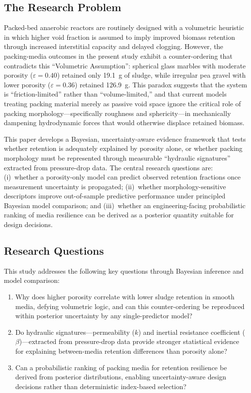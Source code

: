 \documentclass[12pt,a4paper]{article}
\begin{document}
\subsection{The Research Problem}
Packed-bed anaerobic reactors are routinely designed with a volumetric heuristic in which higher void fraction is assumed to imply improved biomass retention through increased interstitial capacity and delayed clogging. However, the packing-media outcomes in the present study exhibit a counter-ordering that contradicts this ``Volumetric Assumption'': spherical glass marbles with moderate porosity ($\varepsilon=0.40$) retained only 19.1~g of sludge, while irregular pea gravel with lower porosity ($\varepsilon=0.36$) retained 126.9~g. This paradox suggests that the system is ``friction-limited'' rather than ``volume-limited,'' and that current models treating packing material merely as passive void space ignore the critical role of packing morphology---specifically roughness and sphericity---in mechanically dampening hydrodynamic forces that would otherwise displace retained biomass.

This paper develops a Bayesian, uncertainty-aware evidence framework that tests whether retention is adequately explained by porosity alone, or whether packing morphology must be represented through measurable ``hydraulic signatures'' extracted from pressure-drop data. The central research questions are: (i)~whether a porosity-only model can predict observed retention fractions once measurement uncertainty is propagated; (ii)~whether morphology-sensitive descriptors improve out-of-sample predictive performance under principled Bayesian model comparison; and (iii)~whether an engineering-facing probabilistic ranking of media resilience can be derived as a posterior quantity suitable for design decisions.

\subsection{Research Questions}
This study addresses the following key questions through Bayesian inference and model comparison:
\begin{enumerate}
    \item Why does higher porosity correlate with lower sludge retention in smooth media, defying volumetric logic, and can this counter-ordering be reproduced within posterior uncertainty by any single-predictor model?
    \item Do hydraulic signatures---permeability ($k$) and inertial resistance coefficient ($\beta$)---extracted from pressure-drop data provide stronger statistical evidence for explaining between-media retention differences than porosity alone?
    \item Can a probabilistic ranking of packing media for retention resilience be derived from posterior distributions, enabling uncertainty-aware design decisions rather than deterministic index-based selection?
\end{enumerate}
\end{document}
